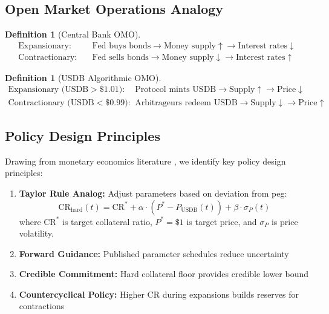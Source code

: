 \documentclass[11pt,a4paper]{article}
\newtheorem{definition}[theorem]{Definition}
\begin{document}
\subsection{Open Market Operations Analogy}

\begin{definition}[Central Bank OMO]
\begin{align}
\text{Expansionary:} &\quad \text{Fed buys bonds} \to \text{Money supply} \uparrow \to \text{Interest rates} \downarrow \\
\text{Contractionary:} &\quad \text{Fed sells bonds} \to \text{Money supply} \downarrow \to \text{Interest rates} \uparrow
\end{align}
\end{definition}

\begin{definition}[USDB Algorithmic OMO]
\begin{align}
\text{Expansionary (USDB} > \$1.01\text{):} &\quad \text{Protocol mints USDB} \to \text{Supply} \uparrow \to \text{Price} \downarrow \\
\text{Contractionary (USDB} < \$0.99\text{):} &\quad \text{Arbitrageurs redeem USDB} \to \text{Supply} \downarrow \to \text{Price} \uparrow
\end{align}
\end{definition}

\subsection{Policy Design Principles}

Drawing from monetary economics literature \cite{Taylor1993, Woodford2003}, we identify key policy design principles:

\begin{enumerate}
    \item \textbf{Taylor Rule Analog:} Adjust parameters based on deviation from peg:
    \begin{equation}
    \text{CR}_{\text{hard}}(t) = \text{CR}^* + \alpha \cdot (P^* - P_{\text{USDB}}(t)) + \beta \cdot \sigma_P(t)
    \end{equation}
    where $\text{CR}^*$ is target collateral ratio, $P^* = \$1$ is target price, and $\sigma_P$ is price volatility.
    
    \item \textbf{Forward Guidance:} Published parameter schedules reduce uncertainty
    
    \item \textbf{Credible Commitment:} Hard collateral floor provides credible lower bound
    
    \item \textbf{Countercyclical Policy:} Higher CR during expansions builds reserves for contractions
\end{enumerate}
\end{document}
